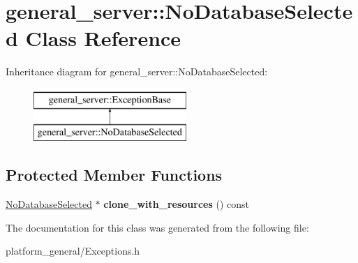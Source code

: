 \hypertarget{classgeneral__server_1_1NoDatabaseSelected}{\section{general\-\_\-server\-:\-:\-No\-Database\-Selected \-Class \-Reference}
\label{classgeneral__server_1_1NoDatabaseSelected}
}
\-Inheritance diagram for general\-\_\-server\-:\-:\-No\-Database\-Selected\-:\begin{figure}[H]
\begin{center}
\leavevmode
\includegraphics[height=2.000000cm]{classgeneral__server_1_1NoDatabaseSelected}
\end{center}
\end{figure}
\subsection*{\-Protected \-Member \-Functions}
\begin{DoxyCompactItemize}
\item 
\hypertarget{classgeneral__server_1_1NoDatabaseSelected_a090caf8181caedcffcbc680b7c3e6423}{\hyperlink{classgeneral__server_1_1NoDatabaseSelected}{\-No\-Database\-Selected} $\ast$ {\bfseries clone\-\_\-with\-\_\-resources} () const }\label{classgeneral__server_1_1NoDatabaseSelected_a090caf8181caedcffcbc680b7c3e6423}

\end{DoxyCompactItemize}


\-The documentation for this class was generated from the following file\-:\begin{DoxyCompactItemize}
\item 
platform\-\_\-general/\-Exceptions.\-h\end{DoxyCompactItemize}
